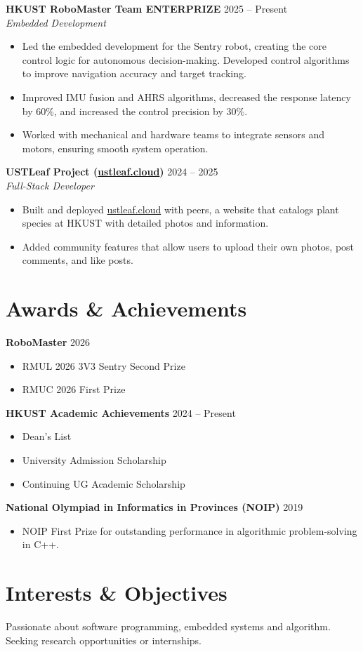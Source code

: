 \documentclass[a4paper,11pt]{article}
\begin{document}
\textbf{HKUST RoboMaster Team ENTERPRIZE} \hfill 2025 -- Present \\
\textit{Embedded Development} 
\begin{itemize}[noitemsep, topsep=0pt]
    \item Led the embedded development for the Sentry robot, creating the core control logic for autonomous decision-making. Developed control algorithms to improve navigation accuracy and target tracking.
    \item Improved IMU fusion and AHRS algorithms, decreased the response latency by 60\%, and increased the control precision by 30\%.
    \item Worked with mechanical and hardware teams to integrate sensors and motors, ensuring smooth system operation.
\end{itemize}

\textbf{USTLeaf Project (\href{https://ustleaf.cloud}{ustleaf.cloud})} \hfill 2024 -- 2025 \\
\textit{Full-Stack Developer} 
\begin{itemize}[noitemsep, topsep=0pt]
    \item Built and deployed \href{https://ustleaf.cloud}{ustleaf.cloud} with peers, a website that catalogs plant species at HKUST with detailed photos and information.
    \item Added community features that allow users to upload their own photos, post comments, and like posts.
\end{itemize}

\section*{Awards \& Achievements}
\textbf{RoboMaster} \hfill 2026
\begin{itemize}[noitemsep, topsep=0pt]
    \item RMUL 2026 3V3 Sentry Second Prize
    \item RMUC 2026 First Prize
\end{itemize}

\textbf{HKUST Academic Achievements} \hfill 2024 -- Present
\begin{itemize}[noitemsep, topsep=0pt]
    \item Dean's List
    \item University Admission Scholarship
    \item Continuing UG Academic Scholarship
\end{itemize}


\textbf{National Olympiad in Informatics in Provinces (NOIP)} \hfill 2019
\begin{itemize}[noitemsep, topsep=0pt]
    \item NOIP First Prize for outstanding performance in algorithmic problem-solving in C++.
\end{itemize}

\section*{Interests \& Objectives}
Passionate about software programming, embedded systems and algorithm. Seeking research opportunities or internships.
\end{document}
